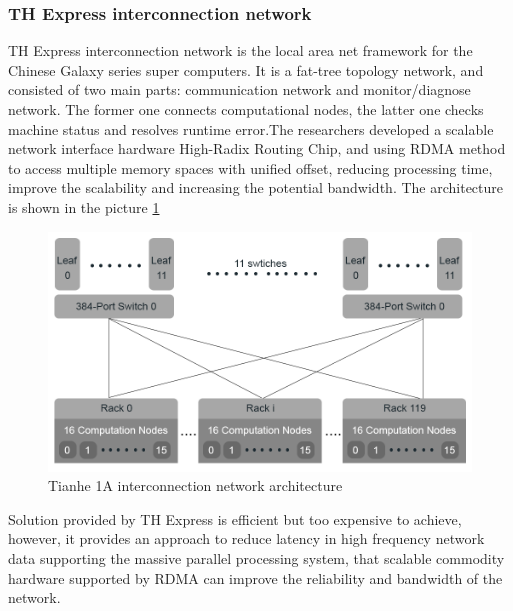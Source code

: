 \documentclass[11pt,openright,a4paper]{report}
\begin{document}
\subsubsection{TH Express interconnection network}
TH Express interconnection network is the local area net framework for the Chinese Galaxy series super computers. It is a fat-tree topology network, and consisted of two main parts: communication network and monitor/diagnose network\cite{yang2011tianhe}. The former one connects computational nodes, the latter one checks machine status and resolves runtime error.The researchers developed a scalable network interface hardware High-Radix Routing Chip, and using RDMA method to access multiple memory spaces with unified offset, reducing processing time, improve the scalability and increasing the potential bandwidth. The architecture is shown in the picture \ref{fig:tianhe1a}\\
\begin{figure}
	\centering
	\includegraphics[width=0.7\linewidth]{picture/tianhe1A.PNG}
	\caption{Tianhe 1A interconnection network architecture}
	\label{fig:tianhe1a}
\end{figure}
Solution provided by TH Express is efficient but too expensive to achieve, however, it provides an approach to reduce latency in high frequency network data supporting the massive parallel processing system, that scalable commodity hardware supported by RDMA can improve the reliability and bandwidth of the network.\\
\end{document}
